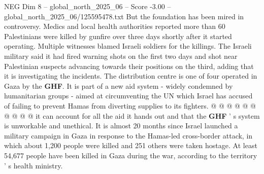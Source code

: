 \begin{textsample}{NEG Dim 8 – global\_north\_2025\_06 – Score -3.00 – global\_north\_2025\_06/125595478.txt}
But the foundation has been mired in controversy.
Medics and local health authorities reported more than 60 Palestinians were killed by gunfire over three days shortly after it started operating.
Multiple witnesses blamed Israeli soldiers for the killings.
The Israeli military said it had fired warning shots on the first two days and shot near Palestinian suspects advancing towards their positions on the third, adding that it is investigating the incidents.
The distribution centre is one of four operated in Gaza by the \textbf{GHF}.
It is part of a new aid system - widely condemned by humanitarian groups - aimed at circumventing the UN which Israel has accused of failing to prevent Hamas from diverting supplies to its fighters. @ @ @ @ @ @ @ @ @ @ it can account for all the aid it hands out and that the \textbf{GHF} ' s system is unworkable and unethical.
It is almost 20 months since Israel launched a military campaign in Gaza in response to the Hamas-led cross-border attack, in which about 1,200 people were killed and 251 others were taken hostage.
At least 54,677 people have been killed in Gaza during the war, according to the territory ' s health ministry.

\end{textsample}
